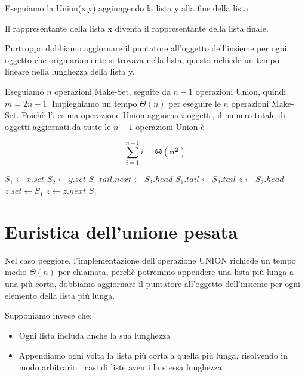Eseguiamo la Union(x,y) aggiungendo la lista y alla fine della lista .

Il rappresentante della lista x diventa il rappresentante della lista finale. 

Purtroppo dobbiamo aggiornare il puntatore all'oggetto dell'insieme per ogni oggetto che originariamente si trovava nella lista, questo richiede un tempo lineare nella lunghezza della lista y.

Eseguiamo $n$ operazioni Make-Set, seguite da $n-1$ operazioni Union, quindi $m=2n-1$. 
Impieghiamo un tempo $\Theta(n)$ per eseguire le $n$ operazioni Make-Set. Poichè l'i-esima operazione Union aggiorna $i$ oggetti, il numero totale di oggetti aggiornati da tutte le $n-1$ operazioni Union è

{
    \Large
    \[
        \sum^{n-1}_{i=1} i = \mathbf{\Theta(n^2)}
    \]
}

\begin{center}
    \begin{algorithmic}[1]
            \State $S_1 \gets x.set$
            \State $S_2 \gets y.set$
            \State $S_1.tail.next \gets S_2.head$
            \State $S_1.tail \gets S_2.tail$
            \State $z \gets S_2.head$
                \State $z.set \gets S_1$
                \State $z \gets z.next$
            \EndWhile
            \State \Return $S_1$
        \EndProcedure
    \end{algorithmic}
\end{center}

\newpage
\section{Euristica dell'unione pesata}
Nel caso peggiore, l'implementazione dell'operazione UNION richiede un tempo medio $\Theta(n)$ per chiamata, perchè potremmo appendere una lista più lunga a una più corta, dobbiamo aggiornare il puntatore all'oggetto dell'insieme per ogni elemento della lista più lunga.

Supponiamo invece che:
\begin{itemize}
    \item Ogni lista includa anche la sua lunghezza
    \item Appendiamo ogni volta la lista più corta a quella più lunga, risolvendo in modo arbitrario i casi di liste aventi la stessa lunghezza
\end{itemize}

